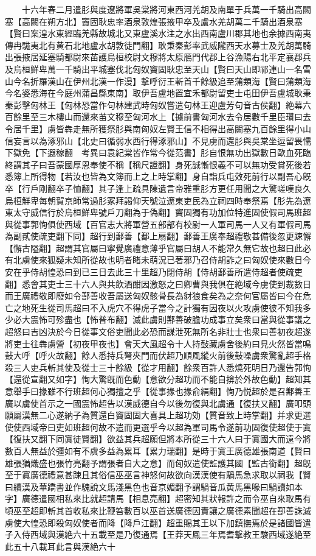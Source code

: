 　　十六年春二月遣肜與度遼將軍吳棠將河東西河羌胡及南單于兵萬一千騎出高闕塞【高闕在朔方北】竇固耿忠率酒泉敦煌張掖甲卒及盧水羌胡萬二千騎出酒泉塞【賢曰案湟水東經臨羌縣故城北又東盧溪水注之水出西南盧川郡其地也余據西南夷傳冉駹夷北有黄石北地盧水胡敦徒門翻】耿秉秦彭率武威隴西天水募士及羌胡萬騎出張掖居延塞騎都尉來苖護烏桓校尉文穆將太原鴈門代郡上谷漁陽右北平定襄郡兵及烏桓鮮卑萬一千騎出平城塞伐北匈奴竇固耿忠至天山【賢曰天山即祁連山一名雪山今名折羅漢山在伊州北漢一作漫】撃呼衍王斬首千餘級追至蒲類海【賢曰蒲類海今名婆悉海在今庭州蒲昌縣東南】取伊吾盧地置宜禾都尉留吏士屯田伊吾盧城耿秉秦彭擊匈林王【匈林恐當作句林建武時匈奴嘗遣句林王迎盧芳句音古侯翻】絶幕六百餘里至三木樓山而還來苖文穆至匈河水上【據前書匈河水去令居數千里臣瓚曰去令居千里】虜皆犇走無所獲祭肜與南匈奴左賢王信不相得出高闕塞九百餘里得小山信妄言以為涿邪山【北史曰循弱水西行得涿邪山】不見虜而還肜與吳棠坐逗留畏懦下獄免【下遐稼翻　考異曰袁紀棠皆作常今從范書】肜自恨無功出獄數日歐血死臨終謂其子曰吾蒙國厚恩奉使不稱【稱尺證翻】身死誠慚恨義不可以無功受賞死後若悉簿上所得物【若汝也皆為文簿而上之上時掌翻】身自詣兵屯效死前行以副吾心旣卒【行戶剛翻卒子恤翻】其子逢上疏具陳遺言帝雅重肜方更任用聞之大驚嗟嘆良久烏桓鮮卑每朝賀京師常過肜冢拜謁仰天號泣遼東吏民為立祠四時奉祭焉【肜先為遼東太守威信行於烏桓鮮卑號戶刀翻為于偽翻】竇固獨有功加位特進固使假司馬班超與從事郭恂俱使西域【百官志大將軍營五部部有校尉一人軍司馬一人又有軍假司馬為副貳使疏吏翻下同】超行到鄯善【鄯上扇翻】鄯善王廣奉超禮敬甚備後忽更踈懈【懈古隘翻】超謂其官屬曰寧覺廣禮意薄乎官屬曰胡人不能常久無它故也超曰此必有北虜使來狐疑未知所從故也明者睹未萌況已著邪乃召侍胡詐之曰匈奴使來數日今安在乎侍胡惶恐曰到已三日去此三十里超乃閉侍胡【侍胡鄯善所遣侍超者使疏吏翻】悉會其吏士三十六人與共飲酒酣因激怒之曰卿曹與我俱在絶域今虜使到裁數日而王廣禮敬即廢如令鄯善收吾屬送匈奴骸骨長為豺狼食矣為之奈何官屬皆曰今在危亡之地死生從司馬超曰不入虎穴不得虎子當今之計獨有因夜以火攻虜使彼不知我多少必大震怖可殄盡也【怖普布翻】滅此虜則鄯善破膽功成事立矣衆曰當與從事議之超怒曰吉凶決於今日從事文俗吏聞此必恐而謀泄死無所名非壯士也衆曰善初夜超遂將吏士往犇虜營【初夜甲夜也】會天大風超令十人持鼔藏虜舍後約曰見火然皆當鳴鼔大呼【呼火故翻】餘人悉持兵弩夾門而伏超乃順風縱火前後鼔噪虜衆驚亂超手格殺三人吏兵斬其使及從士三十餘級【從才用翻】餘衆百許人悉燒死明日乃還告郭恂【還從宣翻又如字】恂大驚旣而色動【意欲分超功而不能自揜於外故色動】超知其意舉手曰掾雖不行班超何心獨擅之乎【從事掾也掾俞絹翻】恂乃悦超於是召鄯善王廣以虜使首示之一國震怖超告以漢威德自今以後勿復與北虜通【復扶又翻】廣叩頭願屬漢無二心遂納子為質還白竇固固大喜具上超功効【質音致上時掌翻】并求更選使使西域帝曰吏如班超何故不遣而更選乎今以超為軍司馬令遂前功固復使超使于寘【復扶又翻下同寘徒賢翻】欲益其兵超願但將本所從三十六人曰于寘國大而遠今將數百人無益於彊如有不虞多益為累耳【累力瑞翻】是時于寘王廣德雄張南道【賢曰雄張猶熾盛也張竹亮翻予謂張者自大之意】而匈奴遣使監護其國【監古銜翻】超旣至于寘廣德禮意甚踈且其俗信巫巫言神怒何故欲向漢漢使有騧馬急求取以祠我【賢曰續漢及華蹻書並作騩說文馬淺黑色也音京媚翻予謂騧音瓜黄馬黑喙曰騧讀如本字】廣德遣國相私來比就超請馬【相息亮翻】超密知其狀報許之而令巫自來取馬有頃巫至超即斬其首收私來比鞭笞數百以巫首送廣德因責讓之廣德素聞超在鄯善誅滅虜使大惶恐即殺匈奴使者而降【降戶江翻】超重賜其王以下加鎮撫焉於是諸國皆遣子入侍西域與漢絶六十五載至是乃復通焉【王莽天鳳三年焉耆撃教王駿西域遂絶至此五十八載耳此言與漢絶六十